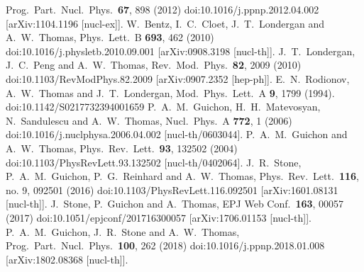 \documentclass{ws-ijmpe}
\begin{document}
\begin{thebibliography}{0}
  Prog.\ Part.\ Nucl.\ Phys.\  {\bf 67}, 898 (2012)
  doi:10.1016/j.ppnp.2012.04.002
  [arXiv:1104.1196 [nucl-ex]].
%
  W.~Bentz, I.~C.~Cloet, J.~T.~Londergan and A.~W.~Thomas,
  Phys.\ Lett.\ B {\bf 693}, 462 (2010)
  doi:10.1016/j.physletb.2010.09.001
  [arXiv:0908.3198 [nucl-th]].
%
  J.~T.~Londergan, J.~C.~Peng and A.~W.~Thomas,
  Rev.\ Mod.\ Phys.\  {\bf 82}, 2009 (2010)
  doi:10.1103/RevModPhys.82.2009
  [arXiv:0907.2352 [hep-ph]].
%
  E.~N.~Rodionov, A.~W.~Thomas and J.~T.~Londergan,
  Mod.\ Phys.\ Lett.\ A {\bf 9}, 1799 (1994).
  doi:10.1142/S0217732394001659
%
  P.~A.~M.~Guichon, H.~H.~Matevosyan, N.~Sandulescu and A.~W.~Thomas,
  Nucl.\ Phys.\ A {\bf 772}, 1 (2006)
  doi:10.1016/j.nuclphysa.2006.04.002
  [nucl-th/0603044].
%
  P.~A.~M.~Guichon and A.~W.~Thomas,
  Phys.\ Rev.\ Lett.\  {\bf 93}, 132502 (2004)
  doi:10.1103/PhysRevLett.93.132502
  [nucl-th/0402064].
%
  J.~R.~Stone, P.~A.~M.~Guichon, P.~G.~Reinhard and A.~W.~Thomas,
  Phys.\ Rev.\ Lett.\  {\bf 116}, no. 9, 092501 (2016)
  doi:10.1103/PhysRevLett.116.092501
  [arXiv:1601.08131 [nucl-th]].
%
  J.~Stone, P.~Guichon and A.~Thomas,
  EPJ Web Conf.\  {\bf 163}, 00057 (2017)
  doi:10.1051/epjconf/201716300057
  [arXiv:1706.01153 [nucl-th]].
%
  P.~A.~M.~Guichon, J.~R.~Stone and A.~W.~Thomas,
  Prog.\ Part.\ Nucl.\ Phys.\  {\bf 100}, 262 (2018)
  doi:10.1016/j.ppnp.2018.01.008
  [arXiv:1802.08368 [nucl-th]].
%
\end{thebibliography}
%
\end{document}
